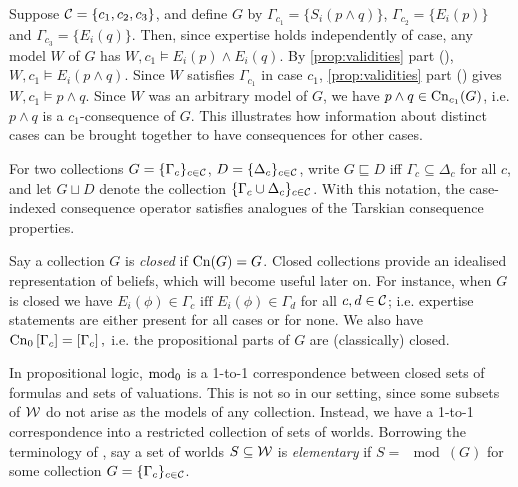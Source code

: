 \begin{example}
    Suppose $\mathcal{C} = \{c_1, c_2, c_3\}$, and define $G$ by $\Gamma_{c_1} = \{S_i(p
    \land q)\}$, $\Gamma_{c_2} = \{E_i(p)\}$ and $\Gamma_{c_3} = \{E_i(q)\}$.
    Then, since expertise holds independently of case, any model $W$ of $G$ has
    $W, c_1 \models E_i(p) \land E_i(q)$. By \cref{prop:validities} part
    (), $W, c_1 \models E_i(p \land q)$.
    Since $W$ satisfies $\Gamma_{c_1}$ in case $c_1$, \cref{prop:validities}
    part () gives $W, c_1 \models p \land
    q$. Since $W$ was an arbitrary model of $G$, we have $p \land q \in
    \operatorname{Cn}_{c_1}(G)$, i.e. $p \land q$ is a $c_1$-consequence of $G$.
    This illustrates how information about distinct cases can be brought
    together to have consequences for other cases.

\end{example}

For two collections $G = \{\Gamma_c\}_{c \in \mathcal{C}}$, $D = \{\Delta_c\}_{c \in
\mathcal{C}}$, write $G \sqsubseteq D$ iff $\Gamma_c \subseteq \Delta_c$ for all $c$,
and let $G \sqcup D$ denote the collection $\{\Gamma_c \cup \Delta_c\}_{c \in
\mathcal{C}}$. With this notation, the case-indexed consequence operator satisfies
analogues of the Tarskian consequence properties.\footnotemark{}
%

Say a collection $G$ is \emph{closed} if $\operatorname{Cn}(G) = G$. Closed collections
provide an idealised representation of beliefs, which will become useful later
on. For instance, when $G$ is closed we have
$
    E_i(\phi) \in \Gamma_c \text{ iff } E_i(\phi) \in \Gamma_d
$
for all $c, d \in \mathcal{C}$; i.e. expertise statements are either present for all
cases or for none. We also have
$
    \operatorname{Cn}_0\left[{\Gamma_c}\right] = \left[{\Gamma_c}\right],
$
i.e. the propositional parts of $G$ are (classically) closed.

In propositional logic, $\operatorname{mod}_0$ is a 1-to-1 correspondence between closed
sets of formulas and sets of valuations. This is not so in our setting, since
some subsets of $\mathcal{W}$ do not arise as the models of any collection. Instead, we
have a 1-to-1 correspondence into a restricted collection of sets of worlds.
%
Borrowing the terminology of
\textcite{delgrande2018general}, say a set of worlds $S \subseteq \mathcal{W}$ is
\emph{elementary} if ${S = \mod(G)}$ for some collection $G =
\{\Gamma_c\}_{c \in \mathcal{C}}$.\footnotemark{}


